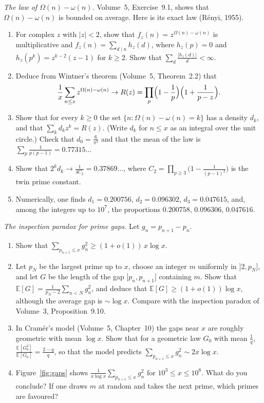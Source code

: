 \begin{exercise}[$\star\star\star$]\label{pb:renyi}
\emph{The law of $\Omega(n)-\omega(n)$.} Volume~5, Exercise~9.1, shows that $\Omega(n)-\omega(n)$ is bounded on average. Here is its exact law (R\'enyi, 1955).
\begin{enumerate}[label=(\alph*)]
\item For complex $z$ with $|z|<2$, show that $f_z(n)=z^{\Omega(n)-\omega(n)}$ is multiplicative and $f_z(n)=\sum_{d\mid n}h_z(d)$, where $h_z(p)=0$ and $h_z(p^k)=z^{k-2}(z-1)$ for $k\ge2$.
Show that $\sum_d\frac{|h_z(d)|}d<\infty$.
\item Deduce from Wintner's theorem (Volume~5, Theorem~2.2) that
\[
\frac1x\sum_{n\le x}z^{\Omega(n)-\omega(n)}\to R(z)=\prod_p\Bigl(1-\frac1p\Bigr)\Bigl(1+\frac1{p-z}\Bigr).
\]
\item Show that for every $k\ge0$ the set $\{n:\Omega(n)-\omega(n)=k\}$ has a density $d_k$, and that $\sum_kd_kz^k=R(z)$. (Write $d_k$ for $n\le x$ as an integral over the
unit circle.) Check that $d_0=\frac6{\pi^2}$ and that the mean of the law is $\sum_p\frac1{p(p-1)}=0.77315\ldots$
\item Show that $2^kd_k\to\frac1{4C_2}=0.37869\ldots$, where $C_2=\prod_{p\ge3}\bigl(1-\frac1{(p-1)^2}\bigr)$ is the twin prime constant.
\item Numerically, one finds $d_1=0.200756$, $d_2=0.096302$, $d_3=0.047615$, and, among the integers up to $10^7$, the proportions $0.200758$, $0.096306$, $0.047616$.
\end{enumerate}
\end{exercise}

\begin{exercise}[$\star\star$]\label{pb:inspection}
\emph{The inspection paradox for prime gaps.} Let $g_n=p_{n+1}-p_n$.
\begin{enumerate}[label=(\alph*)]
\item Show that $\sum_{p_{n+1}\le x}g_n^2\ge(1+o(1))\,x\log x$.
\item Let $p_N$ be the largest prime up to $x$, choose an integer $m$ uniformly in $]2,p_N]$, and let $G$ be the length of the gap $]p_n,p_{n+1}]$ containing $m$. Show that
$\mathbb E[G]=\frac1{p_N-2}\sum_{n<N}g_n^2$, and deduce that $\mathbb E[G]\ge(1+o(1))\log x$, although the average gap is $\sim\log x$. Compare with the inspection paradox
of Volume~3, Proposition~9.10.
\item In Cram\'er's model (Volume~5, Chapter~10) the gaps near $x$ are roughly geometric with mean $\log x$. Show that for a geometric law $G_0$ with mean $\frac1q$,
$\frac{\mathbb E[G_0^2]}{\mathbb E[G_0]}=\frac{2-q}q$, so that the model predicts $\sum_{p_{n+1}\le x}g_n^2\sim2x\log x$.
\item Figure~\ref{fig:gaps} shows $\frac1{x\log x}\sum_{p_{n+1}\le x}g_n^2$ for $10^3\le x\le10^8$. What do you conclude? If one draws $m$ at random and takes the next prime,
which primes are favoured?
\end{enumerate}
\end{exercise}


